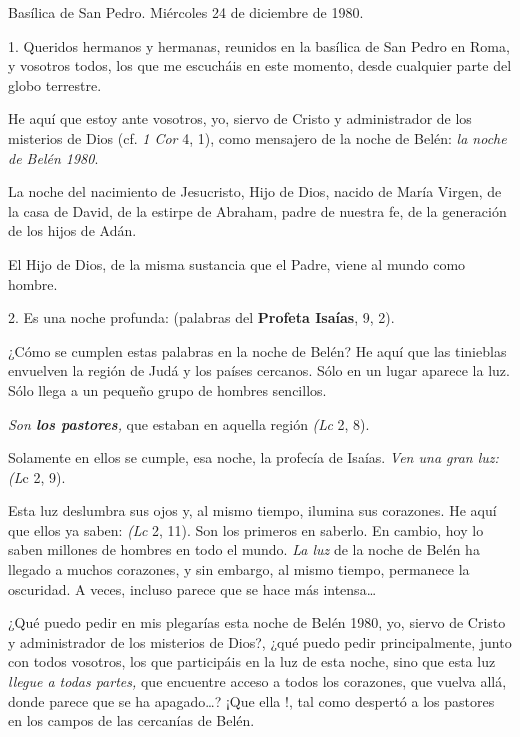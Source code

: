 Basílica de San Pedro. Miércoles 24 de diciembre de 1980.

1. Queridos hermanos y hermanas, reunidos en la basílica de San Pedro en Roma, y vosotros todos, los que me escucháis en este momento, desde cualquier parte del globo terrestre.

He aquí que estoy ante vosotros, yo, siervo de Cristo y administrador de los misterios de Dios (cf. \emph{1 Cor} 4, 1), como mensajero de la noche de Belén: \emph{la noche de Belén 1980}.

La noche del nacimiento de Jesucristo, Hijo de Dios, nacido de María Virgen, de la casa de David, de la estirpe de Abraham, padre de nuestra fe, de la generación de los hijos de Adán.

El Hijo de Dios, de la misma sustancia que el Padre, viene al mundo como hombre.

2. Es una noche profunda:  (palabras del \textbf{Profeta Isaías}, 9, 2).

¿Cómo se cumplen estas palabras en la noche de Belén? He aquí que las tinieblas envuelven la región de Judá y los países cercanos. Sólo en un lugar aparece la luz. Sólo llega a un pequeño grupo de hombres sencillos.

\emph{Son \textbf{los pastores},} que estaban en aquella región  \emph{(Lc} 2, 8).

Solamente en ellos se cumple, esa noche, la profecía de Isaías. \emph{Ven una gran luz:}  \emph{(L}c 2, 9).

Esta luz deslumbra sus ojos y, al mismo tiempo, ilumina sus corazones. He aquí que ellos ya saben:  \emph{(Lc} 2, 11). Son los primeros en saberlo. En cambio, hoy lo saben millones de hombres en todo el mundo. \emph{La luz} de la noche de Belén ha llegado a muchos corazones, y sin embargo, al mismo tiempo, permanece la oscuridad. A veces, incluso parece que se hace más intensa\ldots{}

¿Qué puedo pedir en mis plegarías esta noche de Belén 1980, yo, siervo de Cristo y administrador de los misterios de Dios?, ¿qué puedo pedir principalmente, junto con todos vosotros, los que participáis en la luz de esta noche, sino que esta luz \emph{llegue a todas partes,} que encuentre acceso a todos los corazones, que vuelva allá, donde parece que se ha apagado\ldots{}? ¡Que ella !, tal como despertó a los pastores en los campos de las cercanías de Belén.

